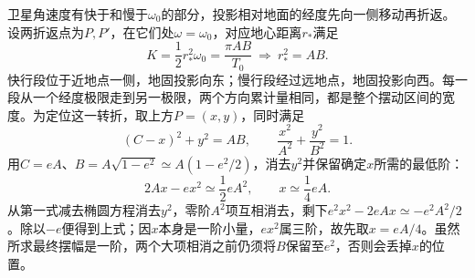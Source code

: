 \documentclass[UTF8,fontset=fandol,a4paper,11pt]{ctexart}
\begin{document}
卫星角速度有快于和慢于$\omega_0$的部分，投影相对地面的经度先向一侧移动再折返。设两折返点为$P,P'$，在它们处$\omega=\omega_0$，对应地心距离$r_*$满足
\[
K=\frac12r_*^2\omega_0
=\frac{\pi AB}{T_0}
\ \Longrightarrow\
\boxed{r_*^2=AB}.
\]
快行段位于近地点一侧，地固投影向东；慢行段经过远地点，地固投影向西。每一段从一个经度极限走到另一极限，两个方向累计量相同，都是整个摆动区间的宽度。为定位这一转折，取上方$P=(x,y)$，同时满足
\[
(C-x)^2+y^2=AB,\qquad
\frac{x^2}{A^2}+\frac{y^2}{B^2}=1.
\]
用$C=eA$、$B=A\sqrt{1-e^2}\simeq A(1-e^2/2)$，消去$y^2$并保留确定$x$所需的最低阶：
\[
2Ax-ex^2\simeq\frac12eA^2,\qquad
x\simeq\frac14eA.
\]
从第一式减去椭圆方程消去$y^2$，零阶$A^2$项互相消去，剩下$e^2x^2-2eAx\simeq-e^2A^2/2$。除以$-e$便得到上式；因$x$本身是一阶小量，$ex^2$属三阶，故先取$x=eA/4$。虽然所求最终摆幅是一阶，两个大项相消之前仍须将$B$保留至$e^2$，否则会丢掉$x$的位置。
\end{document}
